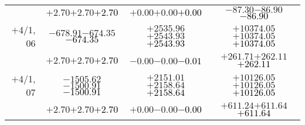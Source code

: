 \documentclass[compress]{beamer}
\begin{document}
\begin{frame}
{\begin{tabular}{r | c | c | c}
           & $+2.70$\hspace{0.1 cm}$+2.70$\hspace{0.1 cm}\textcolor{black}{$+2.70$} & $+0.00$\hspace{0.1 cm}$+0.00$\hspace{0.1 cm}\textcolor{black}{$+0.00$} & $-87.30$\hspace{0.1 cm}$-86.90$\hspace{0.1 cm}\textcolor{black}{$-86.90$} \\
$+$4/1, 06 & $-678.91$\hspace{0.1 cm}$-674.35$\hspace{0.1 cm}\textcolor{black}{$-674.35$} & $+2535.96$\hspace{0.1 cm}$+2543.93$\hspace{0.1 cm}\textcolor{black}{$+2543.93$} & $+10374.05$\hspace{0.1 cm}$+10374.05$\hspace{0.1 cm}\textcolor{black}{$+10374.05$} \\
           & $+2.70$\hspace{0.1 cm}$+2.70$\hspace{0.1 cm}\textcolor{black}{$+2.70$} & $-0.00$\hspace{0.1 cm}$-0.00$\hspace{0.1 cm}\textcolor{black}{$-0.01$} & $+261.71$\hspace{0.1 cm}$+262.11$\hspace{0.1 cm}\textcolor{black}{$+262.11$} \\
$+$4/1, 07 & $-1505.62$\hspace{0.1 cm}$-1500.91$\hspace{0.1 cm}\textcolor{black}{$-1500.91$} & $+2151.01$\hspace{0.1 cm}$+2158.64$\hspace{0.1 cm}\textcolor{black}{$+2158.64$} & $+10126.05$\hspace{0.1 cm}$+10126.05$\hspace{0.1 cm}\textcolor{black}{$+10126.05$} \\
           & $+2.70$\hspace{0.1 cm}$+2.70$\hspace{0.1 cm}\textcolor{black}{$+2.70$} & $+0.00$\hspace{0.1 cm}$-0.00$\hspace{0.1 cm}\textcolor{black}{$-0.00$} & $+611.24$\hspace{0.1 cm}$+611.64$\hspace{0.1 cm}\textcolor{black}{$+611.64$} \\

\end{tabular}}
\end{frame}
\end{document}
